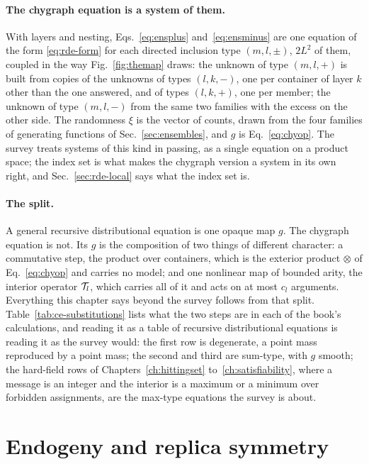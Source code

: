 \paragraph{The chygraph equation is a system of them.} With layers and
nesting, Eqs.~\eqref{eq:ensplus} and~\eqref{eq:ensminus} are one equation
of the form \eqref{eq:rde-form} for each directed inclusion type $(m,l,\pm)$,
$2L^{2}$ of them, coupled in the way Fig.~\ref{fig:themap} draws: the
unknown of type $(m,l,+)$ is built from copies of the unknowns of types
$(l,k,-)$, one per container of layer $k$ other than the one answered, and
of types $(l,k,+)$, one per member; the unknown of type $(m,l,-)$ from the
same two families with the excess on the other side. The randomness $\xi$
is the vector of counts, drawn from the four families of generating
functions of Sec.~\ref{sec:ensembles}, and $g$ is Eq.~\eqref{eq:chyop}. The
survey treats systems of this kind in passing, as a single equation on a
product space; the index set is what makes the chygraph version a system in
its own right, and Sec.~\ref{sec:rde-local} says what the index set is.

\paragraph{The split.} A general recursive distributional equation is one
opaque map $g$. The chygraph equation is not. Its $g$ is the composition of
two things of different character: a commutative step, the product over
containers, which is the exterior product $\otimes$ of Eq.~\eqref{eq:chyop}
and carries no model; and one nonlinear map of bounded arity, the interior
operator $\mathcal{T}_{l}$, which carries all of it and acts on at most $c_{l}$
arguments. Everything this chapter says beyond the survey follows from that
split. Table~\ref{tab:ce-substitutions} lists what the two steps are in each
of the book's calculations, and reading it as a table of recursive
distributional equations is reading it as the survey would: the first row
is degenerate, a point mass reproduced by a point mass; the second and
third are sum-type, with $g$ smooth; the hard-field rows of
Chapters~\ref{ch:hittingset} to~\ref{ch:satisfiability}, where a message is
an integer and the interior is a maximum or a minimum over forbidden
assignments, are the max-type equations the survey is about.

\section{Endogeny and replica symmetry}
\label{sec:rde-endogeny}

